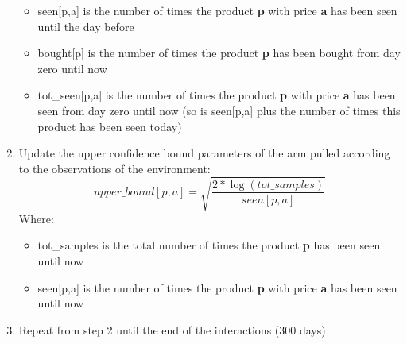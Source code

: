 \begin{enumerate}
\begin{itemize}
            \item seen[p,a] is the number of times the product {\bf p} with price {\bf a} has been seen until the day before
            \item bought[p] is the number of times the product {\bf p} has been bought from day zero until now
            \item tot\_seen[p,a] is the number of times the product {\bf p} with price {\bf a} has been seen from day zero until now (so is seen[p,a] plus the number of times this product has been seen today)
        \end{itemize}
    \item Update the upper confidence bound parameters of the arm pulled according to the observations of the environment:
        \begin{equation}
            upper\_bound[p,a] = \sqrt{\frac{2 * \log (tot\_samples)}{seen[p,a]}}
        \end{equation}Where:
        \begin{itemize}
            \item tot\_samples is the total number of times the product {\bf p} has been seen until now
            \item seen[p,a] is the number of times the product {\bf p} with price {\bf a} has been seen  until now
        \end{itemize}
    \item Repeat from step 2 until the end of the interactions (300 days)
\end{enumerate}
